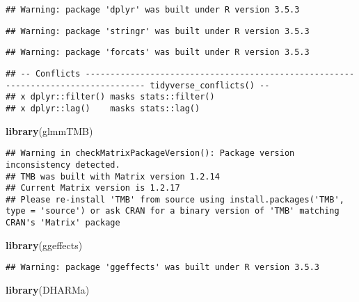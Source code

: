 \documentclass[]{article}
\newenvironment{Shaded}{\begin{snugshade}}{\end{snugshade}}
\newcommand{\KeywordTok}[1]{\textcolor[rgb]{0.13,0.29,0.53}{\textbf{#1}}}
\newcommand{\NormalTok}[1]{#1}
\begin{document}
\begin{verbatim}
## Warning: package 'dplyr' was built under R version 3.5.3
\end{verbatim}

\begin{verbatim}
## Warning: package 'stringr' was built under R version 3.5.3
\end{verbatim}

\begin{verbatim}
## Warning: package 'forcats' was built under R version 3.5.3
\end{verbatim}

\begin{verbatim}
## -- Conflicts ---------------------------------------------------------------------------------- tidyverse_conflicts() --
## x dplyr::filter() masks stats::filter()
## x dplyr::lag()    masks stats::lag()
\end{verbatim}

\begin{Shaded}
\begin{Highlighting}[]
\KeywordTok{library}\NormalTok{(glmmTMB)}
\end{Highlighting}
\end{Shaded}

\begin{verbatim}
## Warning in checkMatrixPackageVersion(): Package version inconsistency detected.
## TMB was built with Matrix version 1.2.14
## Current Matrix version is 1.2.17
## Please re-install 'TMB' from source using install.packages('TMB', type = 'source') or ask CRAN for a binary version of 'TMB' matching CRAN's 'Matrix' package
\end{verbatim}

\begin{Shaded}
\begin{Highlighting}[]
\KeywordTok{library}\NormalTok{(ggeffects)}
\end{Highlighting}
\end{Shaded}

\begin{verbatim}
## Warning: package 'ggeffects' was built under R version 3.5.3
\end{verbatim}

\begin{Shaded}
\begin{Highlighting}[]
\KeywordTok{library}\NormalTok{(DHARMa)}
\end{Highlighting}
\end{Shaded}
\end{document}
